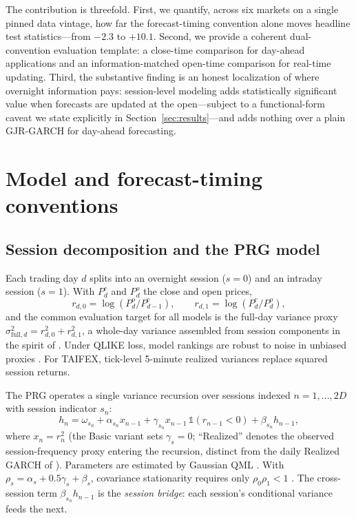 \documentclass[11pt,a4paper]{article}
\begin{document}
The contribution is threefold. First, we quantify, across six markets on a single pinned data vintage, how far the forecast-timing convention alone moves headline test statistics---from $-2.3$ to $+10.1$.
Second, we provide a coherent dual-convention evaluation template: a close-time comparison for day-ahead applications and an information-matched open-time comparison for real-time updating. Third, the substantive finding is an honest localization of where overnight information pays: session-level modeling adds statistically significant value when forecasts are updated at the open---subject to a functional-form caveat we state explicitly in Section~\ref{sec:results}---and adds nothing over a plain GJR-GARCH for day-ahead forecasting.

\section{Model and forecast-timing conventions}

\subsection{Session decomposition and the PRG model}

Each trading day $d$ splits into an overnight session ($s=0$) and an intraday session ($s=1$). With $P^{c}_d$ and $P^{o}_d$ the close and open prices,
\begin{equation}
    r_{d,0} = \log(P^{o}_d / P^{c}_{d-1}), \qquad
    r_{d,1} = \log(P^{c}_d / P^{o}_d),
    \label{eq:sessions}
\end{equation}
and the common evaluation target for all models is the full-day variance proxy $\sigma^2_{\text{full},d} = r^2_{d,0} + r^2_{d,1}$, a whole-day variance assembled from session components in the spirit of \citet{HansenLunde2005}. Under QLIKE loss, model rankings are robust to noise in unbiased proxies \citep{Patton2011,Hansen2006}. For TAIFEX, tick-level 5-minute realized variances replace squared session returns.

The PRG operates a single variance recursion over sessions indexed $n = 1, \ldots, 2D$ with session indicator $s_n$:
\begin{equation}
    h_n = \omega_{s_n} + \alpha_{s_n} x_{n-1} + \gamma_{s_n} x_{n-1}\,\mathbb{1}(r_{n-1}<0) + \beta_{s_n} h_{n-1},
    \label{eq:prg}
\end{equation}
where $x_n = r^2_n$ (the Basic variant sets $\gamma_s = 0$; ``Realized'' denotes the observed session-frequency proxy entering the recursion, distinct from the daily Realized GARCH of \citealp{Hansen2012}). Parameters are estimated by Gaussian QML \citep{BollerslevWooldridge1992}. With $\rho_s = \alpha_s + 0.5\gamma_s + \beta_s$, covariance stationarity requires only $\rho_0\rho_1 < 1$ \citep{Bollerslev1996}. The cross-session term $\beta_{s_n} h_{n-1}$ is the \emph{session bridge}: each session's conditional variance feeds the next.
\end{document}
